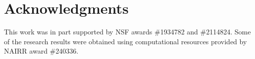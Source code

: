 \section*{Acknowledgments}

This work was in part supported by NSF awards \#1934782 and \#2114824. Some of the research results were obtained using computational resources provided by NAIRR award \#240336.